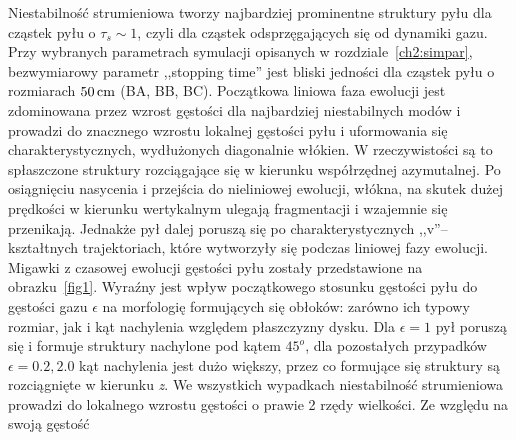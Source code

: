 Niestabilność strumieniowa tworzy najbardziej prominentne struktury pyłu dla
cząstek pyłu o $\tau_s \sim 1$, czyli dla cząstek odsprzęgających się od
dynamiki gazu.
Przy wybranych parametrach symulacji opisanych w rozdziale~\ref{ch2:simpar},
bezwymiarowy parametr ,,stopping time'' jest bliski jedności dla cząstek pyłu o
rozmiarach $50\hbox{$\thinspace\textrm{cm}$}$ (BA, BB, BC). Początkowa liniowa faza ewolucji jest
zdominowana przez wzrost gęstości dla najbardziej niestabilnych modów i prowadzi
do znacznego wzrostu lokalnej gęstości pyłu i uformowania się
charakterystycznych, wydłużonych diagonalnie włókien. W rzeczywistości są to
spłaszczone struktury rozciągające się w kierunku współrzędnej azymutalnej. Po
osiągnięciu nasycenia i przejścia do nieliniowej ewolucji, włókna, na skutek
dużej prędkości w kierunku wertykalnym ulegają fragmentacji i wzajemnie się
przenikają. Jednakże pył dalej poruszą się po charakterystycznych
,,v''--kształtnych trajektoriach, które wytworzyły się podczas liniowej fazy
ewolucji. Migawki z czasowej ewolucji gęstości pyłu zostały przedstawione na
obrazku~\ref{fig1}. Wyraźny jest wpływ początkowego stosunku gęstości pyłu do
gęstości gazu $\epsilon$ na morfologię formujących się obłoków: zarówno ich
typowy rozmiar, jak i kąt nachylenia względem płaszczyzny dysku. Dla $\epsilon =
1$ pył poruszą się i formuje struktury nachylone pod kątem $45^o$, dla
pozostałych przypadków $\epsilon=0.2, 2.0$ kąt nachylenia jest dużo większy,
przez co formujące się struktury są rozciągnięte w kierunku \emph{z}. We
wszystkich wypadkach niestabilność strumieniowa prowadzi do lokalnego wzrostu
gęstości o prawie 2 rzędy wielkości.  Ze względu na swoją gęstość

